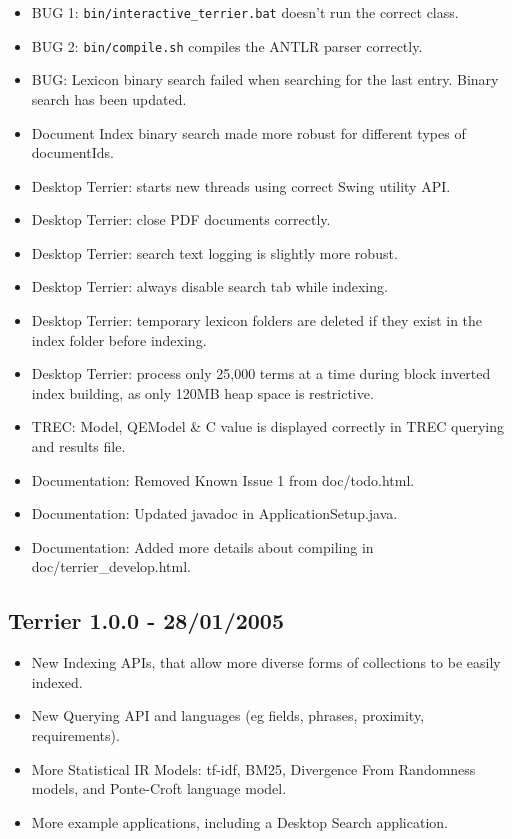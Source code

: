 \begin{itemize}
\tightlist
\item
  BUG 1: \texttt{bin/interactive\_terrier.bat} doesn't run the correct
  class.
\item
  BUG 2: \texttt{bin/compile.sh} compiles the ANTLR parser correctly.
\item
  BUG: Lexicon binary search failed when searching for the last entry.
  Binary search has been updated.
\item
  Document Index binary search made more robust for different types of
  documentIds.
\item
  Desktop Terrier: starts new threads using correct Swing utility API.
\item
  Desktop Terrier: close PDF documents correctly.
\item
  Desktop Terrier: search text logging is slightly more robust.
\item
  Desktop Terrier: always disable search tab while indexing.
\item
  Desktop Terrier: temporary lexicon folders are deleted if they exist
  in the index folder before indexing.
\item
  Desktop Terrier: process only 25,000 terms at a time during block
  inverted index building, as only 120MB heap space is restrictive.
\item
  TREC: Model, QEModel \& C value is displayed correctly in TREC
  querying and results file.
\item
  Documentation: Removed Known Issue 1 from doc/todo.html.
\item
  Documentation: Updated javadoc in ApplicationSetup.java.
\item
  Documentation: Added more details about compiling in
  doc/terrier\_develop.html.
\end{itemize}

\subsection{Terrier 1.0.0 - 28/01/2005}\label{terrier-1.0.0---28012005}

\begin{itemize}
\tightlist
\item
  New Indexing APIs, that allow more diverse forms of collections to be
  easily indexed.
\item
  New Querying API and languages (eg fields, phrases, proximity,
  requirements).
\item
  More Statistical IR Models: tf-idf, BM25, Divergence From Randomness
  models, and Ponte-Croft language model.
\item
  More example applications, including a Desktop Search application.
\end{itemize}

